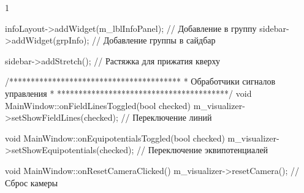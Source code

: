 \begin{listing}{1}
{  infoLayout->addWidget(m_lblInfoPanel); // Добавление в группу
  sidebar->addWidget(grpInfo); // Добавление группы в сайдбар

  sidebar->addStretch(); // Растяжка для прижатия кверху
}

/****************************************
* Обработчики сигналов управления       *
****************************************/
void MainWindow::onFieldLinesToggled(bool checked) {
  m_visualizer->setShowFieldLines(checked); // Переключение линий
}

void MainWindow::onEquipotentialsToggled(bool checked) {
  m_visualizer->setShowEquipotentials(checked); // Переключение эквипотенциалей
}

void MainWindow::onResetCameraClicked() {
  m_visualizer->resetCamera(); // Сброс камеры
}

\end{listing}
\normalsize
\pagebreak
